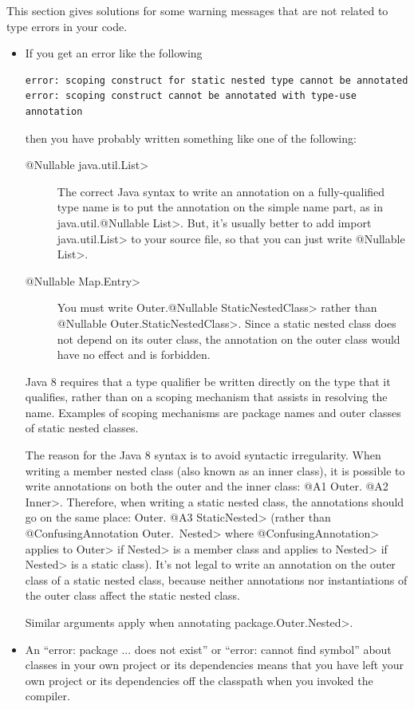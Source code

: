 
This section gives solutions for some warning messages that are not related
to type errors in your code.

\begin{itemize}

\item
If you get an error like the following

\begin{Verbatim}
error: scoping construct for static nested type cannot be annotated
error: scoping construct cannot be annotated with type-use annotation
\end{Verbatim}

\noindent
  then you have probably written something like one of the following:
\begin{description}
\item[\<@Nullable java.util.List>]
The correct Java syntax to write an annotation on a fully-qualified type
name is to put the annotation on the simple name part, as in
\<java.util.@Nullable List>.  But, it's usually
better to add \<import java.util.List> to your source file, so that you can
just write \<@Nullable List>.
\item[\<@Nullable Map.Entry>]  You must write \<Outer.@Nullable
StaticNestedClass> rather than \<@Nullable Outer.StaticNestedClass>.
Since a static nested class does not depend on its outer class, the
annotation on the outer class would have no effect and is forbidden.
\end{description}

Java 8 requires that a type qualifier be written directly on the type that
it qualifies, rather than on a scoping mechanism that assists in resolving
the name.  Examples of scoping mechanisms are package names and outer
classes of static nested classes.

The reason for the Java 8 syntax is to avoid syntactic irregularity.  When
writing a member nested class (also known as an inner class), it is
possible to write annotations on both the outer and the inner class:  \<@A1
Outer. @A2 Inner>.  Therefore, when writing a static nested class, the
annotations should go on the same place:  \<Outer. @A3 StaticNested> (rather
than \<@ConfusingAnnotation Outer.\ Nested> where
\<@ConfusingAnnotation> applies to \<Outer> if \<Nested> is a member class
and applies to \<Nested> if \<Nested> is a static class).  It's not legal
to write an annotation on the outer class of a static nested class, because
neither annotations nor instantiations of the outer class affect the static
nested class.

Similar arguments apply when annotating \<package.Outer.Nested>.

\item
An ``error: package ... does not exist'' or ``error: cannot find symbol''
about classes in your own project or its dependencies means that you have
left your own project or its dependencies off the classpath when you
invoked the compiler.

\end{itemize}


